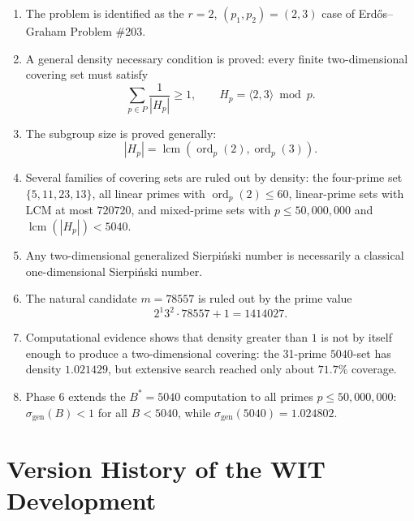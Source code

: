 \documentclass[11pt]{article}
\theoremstyle{definition}
\theoremstyle{remark}
\DeclareMathOperator{\ord}{ord}
\DeclareMathOperator{\lcm}{lcm}
\begin{document}
\begin{enumerate}
    \item The problem is identified as the \(r=2\), \((p_1,p_2)=(2,3)\) case
    of Erd\H{o}s--Graham Problem \#203.

    \item A general density necessary condition is proved:
    every finite two-dimensional covering set must satisfy
    \[
        \sum_{p\in P}\frac1{|H_p|}\geq 1,
        \qquad
        H_p=\langle 2,3\rangle\bmod p.
    \]

    \item The subgroup size is proved generally:
    \[
        |H_p|=\lcm(\ord_p(2),\ord_p(3)).
    \]

    \item Several families of covering sets are ruled out by density:
    the four-prime set \(\{5,11,23,13\}\), all linear primes with
    \(\ord_p(2)\leq 60\), linear-prime sets with LCM at most \(720720\), and
    mixed-prime sets with \(p\leq 50{,}000{,}000\) and
    \(\lcm(|H_p|)<5040\).

    \item Any two-dimensional generalized Sierpi\'nski number is necessarily a
    classical one-dimensional Sierpi\'nski number.

    \item The natural candidate \(m=78557\) is ruled out by the prime value
    \[
        2^1 3^2\cdot 78557+1=1414027.
    \]

    \item Computational evidence shows that density greater than \(1\) is not
    by itself enough to produce a two-dimensional covering: the 31-prime
    \(5040\)-set has density \(1.021429\), but extensive search reached only
    about \(71.7\%\) coverage.

    \item Phase 6 extends the \(B^*=5040\) computation to all primes
    \(p\leq 50{,}000{,}000\): \(\sigma_{\mathrm{gen}}(B)<1\) for all
    \(B<5040\), while \(\sigma_{\mathrm{gen}}(5040)=1.024802\).
\end{enumerate}

\section{Version History of the WIT Development}
\end{document}
